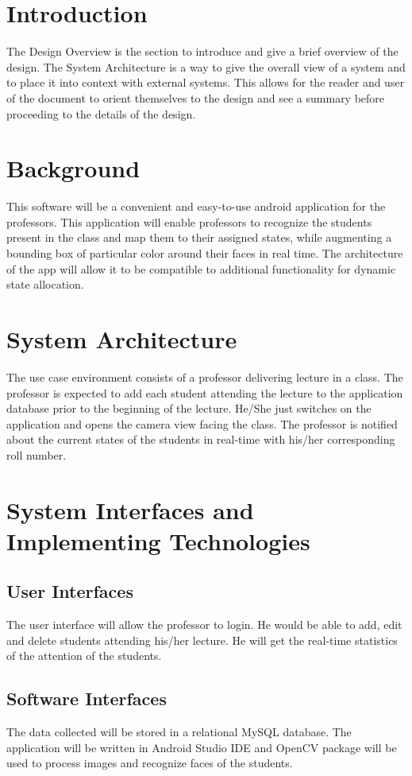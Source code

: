 \documentclass{scrreprt}
\begin{document}
\section{Introduction}
The Design Overview is the section to introduce and give a brief overview of the design. The System Architecture is a way to give the overall view of a system and to place it into context with external systems. This allows for the reader and user of the document to orient themselves to the design and see a summary before proceeding to the details of the design.
\section{Background}
This software will be a convenient and easy-to-use android application for the professors.
This application will enable professors to recognize the students present in the class and map them to their assigned states, while augmenting a bounding box of particular color around their faces in real time. The
architecture of the app will allow it to be compatible to additional functionality for
dynamic state allocation.
\section{System Architecture}
The use case environment consists of a professor delivering lecture in a class. The professor is expected to add each student attending the lecture to the application database prior to the beginning of the lecture. He/She just switches on the application and opens the camera view facing the class. The professor is notified about the current states of the students in real-time with his/her corresponding roll number.

\section{System Interfaces and Implementing Technologies}
\subsection{User Interfaces}
The user interface will allow the professor to login. He would be able to add, edit and delete students attending his/her lecture. He will get the real-time statistics of the attention of the students.
\subsection{Software Interfaces}
The data collected will be stored in a relational MySQL database.
The application will be written in Android Studio IDE and OpenCV package will be used to process images and recognize faces of the students.
\end{document}

